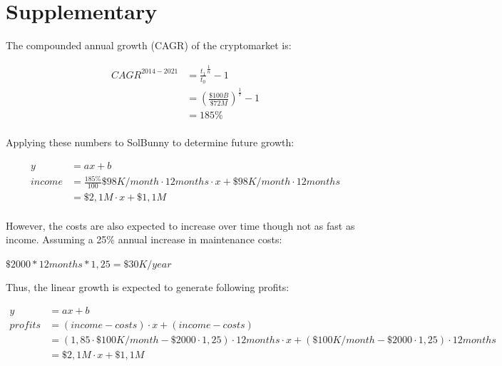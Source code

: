 \documentclass[12pt]{article}
\begin{document}






\clearpage

\section*{Supplementary}
The compounded annual growth (CAGR) of the cryptomarket is:

\begin{equation}\label{growth}
\begin{split}
CAGR^{2014-2021} &= \frac{t_{1}}{t_{0}}^{\frac{1}{n}}-1\\
 &=  (\frac{\$100B}{\$72M})^{\frac{1}{7}}-1\\
 &=185\%
\end{split}
\end{equation}
\\

Applying these numbers to SolBunny to determine future growth:

\begin{equation}\label{growth}
\begin{split}
y &=ax+b\\
income &=\frac{185\%}{100}\$98K/month \cdot 12months \cdot x + \$98K/month \cdot 12months\\
 &= \$2,1M \cdot x + \$1,1M
\end{split}
\end{equation}
\\

However, the costs are also expected to increase over time though not as fast as income. Assuming a 25\% annual increase in maintenance costs:

$\$2000*12months*1,25=\$30K/year$

Thus, the linear growth is expected to generate following profits:

\begin{equation}\label{profits}
\begin{split}
y &=ax+b\\
profits &=(income-costs) \cdot x + (income-costs)\\
 &= (1,85 \cdot \$100K/month - \$2000 \cdot 1,25)\cdot 12months \cdot  x + (\$100K/month - \$2000 \cdot 1,25)\cdot 12months\\
 &= \$2,1M \cdot x + \$1,1M
\end{split}
\end{equation}
\\
\end{document}
